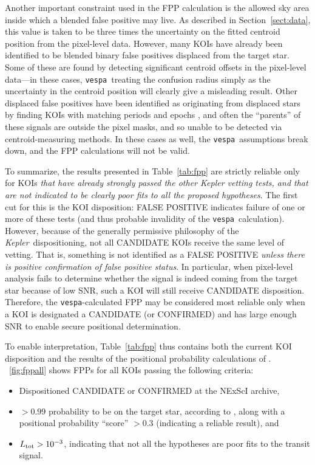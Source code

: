 \documentclass{emulateapj}
\newcommand{\figref}[1]{\ref{fig:#1}}
\newcommand{\Fig}[1]{\figurename~\figref{#1}}
\newcommand{\Tab}[1]{Table~\ref{tab:#1}}
\newcommand{\tab}[1]{\Tab{#1}}
\newcommand{\sectionname}{Section}
\newcommand{\Sect}[1]{\sectionname~\ref{sect:#1}}
\newcommand{\sect}[1]{\Sect{#1}}
\newcommand{\posprobthresh}{0.3}
\newcommand{\kepler}{\textit{Kepler}}
\newcommand{\vespa}{\texttt{vespa}}
\begin{document}
Another important constraint used in the FPP calculation is the
allowed sky area inside which a blended false positive may live.  As
described in \sect{data}, this value is taken to be three times the
uncertainty on the fitted centroid position from the pixel-level data.
However, many KOIs have already been identified to be blended binary
false positives displaced from the target star.  Some of these are
found by detecting significant centroid offsets in the pixel-level
data---in these cases, \vespa\ treating the confusion radius simply as
the uncertainty in the centroid position will clearly give a
misleading result.  Other displaced false positives have been
identified as originating from displaced stars by finding KOIs with
matching periods and epochs \citep{Coughlin:2014}, and often the
``parents'' of these signals are outside the pixel masks, and so
unable to be detected via centroid-measuring methods.  In these cases
as well, the \vespa\ assumptions break down, and the FPP calculations
will not be valid.

To summarize, the results presented in \tab{fpp} are strictly reliable
only for KOIs \emph{that have already strongly passed the other Kepler
  vetting tests, and that are not indicated to be clearly poor fits to
  all the proposed hypotheses}.  The first cut for this is the KOI
disposition: FALSE POSITIVE indicates failure of one or more of these
tests (and thus probable invalidity of the \vespa\ calculation).
However, because of the generally permissive philosophy of the
\kepler\ dispositioning, not all CANDIDATE KOIs receive the same level
of vetting.  That is, something is not identified as a FALSE POSITIVE
\emph{unless there is positive confirmation of false positive status}.
In particular, when pixel-level analysis fails to determine whether
the signal is indeed coming from the target star because of low SNR,
such a KOI will still receive CANDIDATE disposition.  Therefore, the
\vespa-calculated FPP may be considered most reliable only when a KOI
is designated a CANDIDATE (or CONFIRMED) and has large enough SNR to
enable secure positional determination.


To enable interpretation, \tab{fpp} thus contains both the current KOI
disposition and the results of the positional probability calculations
of \citet{Bryson:KSCI}.  \Fig{fppall} shows FPPs for all KOIs passing
the following criteria:
\begin{itemize}
\item Dispositioned CANDIDATE or CONFIRMED at the NExScI archive,
\item $> 0.99$ probability to be on the target star, according
  to \citet{Bryson:KSCI}, along with a positional probability
  ``score'' $> \posprobthresh$ (indicating a reliable result), and   
\item $L_{\rm tot} > 10^{-3}$, indicating that not all the hypotheses are
  poor fits to the transit signal.
\end{itemize}
\end{document}
